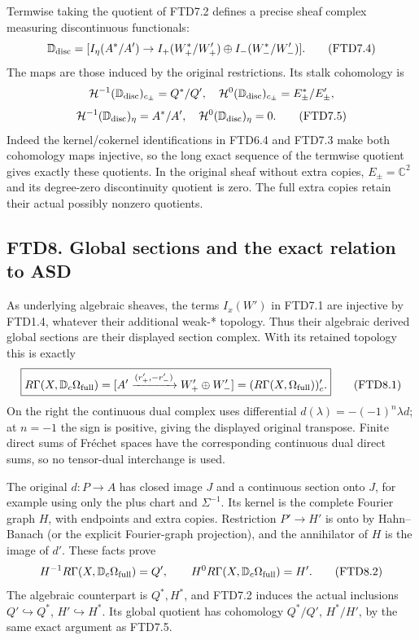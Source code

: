 Termwise taking the quotient of FTD7.2 defines a precise sheaf complex
measuring discontinuous functionals: \[
\mathbb D_{\rm disc}
=[I_\eta(A^*/A')\to
I_+(W_+^*/W_+')\oplus I_-(W_-^*/W_-')].
\tag{FTD7.4}
\] The maps are those induced by the original restrictions. Its stalk
cohomology is \[
\mathcal H^{-1}(\mathbb D_{\rm disc})_{c_\pm}=Q^*/Q',
\quad
\mathcal H^0(\mathbb D_{\rm disc})_{c_\pm}=E_\pm^*/E_\pm',
\] \[
\mathcal H^{-1}(\mathbb D_{\rm disc})_\eta=A^*/A',
\quad
\mathcal H^0(\mathbb D_{\rm disc})_\eta=0.
\tag{FTD7.5}
\] Indeed the kernel/cokernel identifications in FTD6.4 and FTD7.3 make
both cohomology maps injective, so the long exact sequence of the
termwise quotient gives exactly these quotients. In the original sheaf
without extra copies, \(E_\pm=\mathbb C^2\) and its degree-zero
discontinuity quotient is zero. The full extra copies retain their
actual possibly nonzero quotients.

\subsection{FTD8. Global sections and the exact relation to
ASD}\label{ftd8.-global-sections-and-the-exact-relation-to-asd}

As underlying algebraic sheaves, the terms \(I_x(W')\) in FTD7.1 are
injective by FTD1.4, whatever their additional weak-* topology. Thus
their algebraic derived global sections are their displayed section
complex. With its retained topology this is exactly \[
\boxed{
R\Gamma(X,\mathbb D_c\Omega_{\rm full})
=[A'\xrightarrow{(r_+',-r_-')}W_+'\oplus W_-']
=(R\Gamma(X,\Omega_{\rm full}))'_c.}
\tag{FTD8.1}
\] On the right the continuous dual complex uses differential
\(d(\lambda)=-(-1)^n\lambda d\); at \(n=-1\) the sign is positive,
giving the displayed original transpose. Finite direct sums of Fréchet
spaces have the corresponding continuous dual direct sums, so no
tensor-dual interchange is used.

The original \(d:P\to A\) has closed image \(J\) and a continuous
section onto \(J\), for example using only the plus chart and
\(\Sigma^{-1}\). Its kernel is the complete Fourier graph \(H\), with
endpoints and extra copies. Restriction \(P'\to H'\) is onto by
Hahn--Banach (or the explicit Fourier-graph projection), and the
annihilator of \(H\) is the image of \(d'\). These facts prove \[
H^{-1}R\Gamma(X,\mathbb D_c\Omega_{\rm full})=Q',
\qquad
H^0R\Gamma(X,\mathbb D_c\Omega_{\rm full})=H'.
\tag{FTD8.2}
\] The algebraic counterpart is \(Q^*,H^*\), and FTD7.2 induces the
actual inclusions \(Q'\hookrightarrow Q^*\), \(H'\hookrightarrow H^*\).
Its global quotient has cohomology \(Q^*/Q'\), \(H^*/H'\), by the same
exact argument as FTD7.5.

